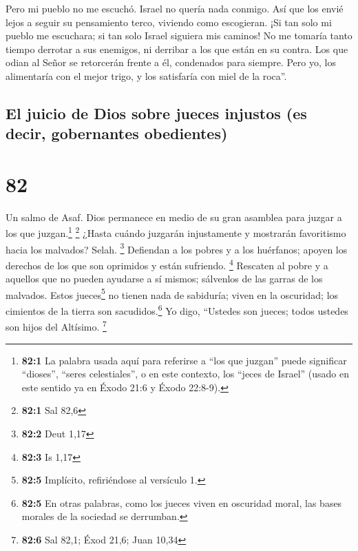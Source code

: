  Pero mi pueblo no me escuchó. Israel no quería nada
conmigo.  Así que los envié lejos a seguir su pensamiento
terco, viviendo como escogieran.  ¡Si tan solo mi pueblo
me escuchara; si tan solo Israel siguiera mis caminos! 
No me tomaría tanto tiempo derrotar a sus enemigos, ni derribar a los
que están en su contra.  Los que odian al Señor se
retorcerán frente a él, condenados para siempre.  Pero
yo, los alimentaría con el mejor trigo, y los satisfaría con miel de la
roca''.

\hypertarget{el-juicio-de-dios-sobre-jueces-injustos-es-decir-gobernantes-obedientes}{%
\subsection{El juicio de Dios sobre jueces injustos (es decir,
gobernantes
obedientes)}\label{el-juicio-de-dios-sobre-jueces-injustos-es-decir-gobernantes-obedientes}}

\hypertarget{section-81}{%
\section{82}\label{section-81}}

Un salmo de Asaf.  Dios permanece en medio de su gran
asamblea para juzgar a los que juzgan.\footnote{\textbf{82:1} La palabra
  usada aquí para referirse a ``los que juzgan'' puede significar
  ``dioses'', ``seres celestiales'', o en este contexto, los ``jeces de
  Israel'' (usado en este sentido ya en Éxodo 21:6 y Éxodo 22:8-9).}
\footnote{\textbf{82:1} Sal 82,6}  ¿Hasta cuándo juzgarán
injustamente y mostrarán favoritismo hacia los malvados? Selah.
\footnote{\textbf{82:2} Deut 1,17}  Defiendan a los pobres
y a los huérfanos; apoyen los derechos de los que son oprimidos y están
sufriendo. \footnote{\textbf{82:3} Is 1,17}  Rescaten al
pobre y a aquellos que no pueden ayudarse a sí mismos; sálvenlos de las
garras de los malvados.  Estos jueces\footnote{\textbf{82:5}
  Implícito, refiriéndose al versículo 1.} no tienen nada de sabiduría;
viven en la oscuridad; los cimientos de la tierra son
sacudidos.\footnote{\textbf{82:5} En otras palabras, como los jueces
  viven en oscuridad moral, las bases morales de la sociedad se
  derrumban.}  Yo digo, ``Ustedes son jueces; todos
ustedes son hijos del Altísimo. \footnote{\textbf{82:6} Sal 82,1; Éxod
  21,6; Juan 10,34}

